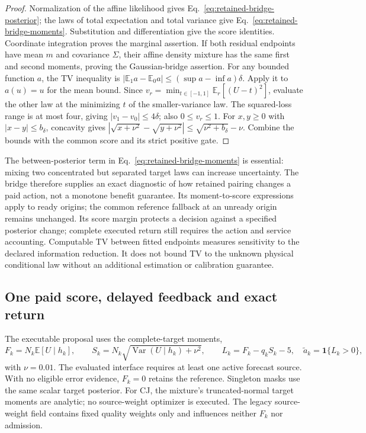 \documentclass[10pt]{article}
\begin{document}
\begin{proof}
Normalization of the affine likelihood gives
Eq.~\eqref{eq:retained-bridge-posterior}; the laws of total expectation
and total variance give Eq.~\eqref{eq:retained-bridge-moments}.
Substitution and differentiation give the score identities.
Coordinate integration proves the marginal assertion.  If both residual
endpoints have mean $m$ and covariance $\Sigma$, their affine density
mixture has the same first and second moments, proving the Gaussian-bridge
assertion.  For any bounded function $a$, the TV inequality is
$|\mathbb E_1a-\mathbb E_0a|\leq(\sup a-\inf a)\delta$.
Apply it to $a(u)=u$ for the mean bound.  Since
$v_r=\min_{t\in[-1,1]}\mathbb E_r[(U-t)^2]$, evaluate the other law
at the minimizing $t$ of the smaller-variance law.  The squared-loss range
is at most four, giving $|v_1-v_0|\leq4\delta$; also $0\leq v_r\leq1$.
For $x,y\geq0$ with $|x-y|\leq b_\delta$, concavity gives
$|\sqrt{x+\nu^2}-\sqrt{y+\nu^2}|\leq\sqrt{\nu^2+b_\delta}-\nu$.
Combine the bounds with the common score and its strict positive gate.
\end{proof}

The between-posterior term in Eq.~\eqref{eq:retained-bridge-moments}
is essential: mixing two concentrated but separated target laws can increase
uncertainty.  The bridge therefore supplies an exact diagnostic of how
retained pairing changes a paid action, not a monotone benefit guarantee.
Its moment-to-score expressions apply to ready origins; the common reference
fallback at an unready origin remains unchanged.
Its score margin protects a decision against a specified posterior change;
complete executed return still requires the action and service accounting.
Computable TV between fitted endpoints measures sensitivity to the declared
information reduction.  It does not bound TV to the unknown physical
conditional law without an additional estimation or calibration guarantee.

\subsection{One paid score, delayed feedback and exact return}
The executable proposal uses the complete-target moments,
\begin{equation}
 F_k=N_k\mathbb E[U\mid h_k],\qquad
 S_k=N_k\sqrt{\operatorname{Var}(U\mid h_k)+\nu^2},\qquad
 L_k=F_k-q_kS_k-5,\quad \widetilde a_k=\mathbf1\{L_k>0\},
 \label{eq:posterior-gate}
\end{equation}
with $\nu=0.01$. The evaluated interface requires at least one active
forecast source. With no eligible error evidence, $F_k=0$ retains the
reference. Singleton masks use the same scalar target posterior. For CJ,
the mixture's truncated-normal target moments are analytic; no source-weight
optimizer is executed. The legacy source-weight field contains fixed quality
weights only and influences neither $F_k$ nor admission.
\end{document}
